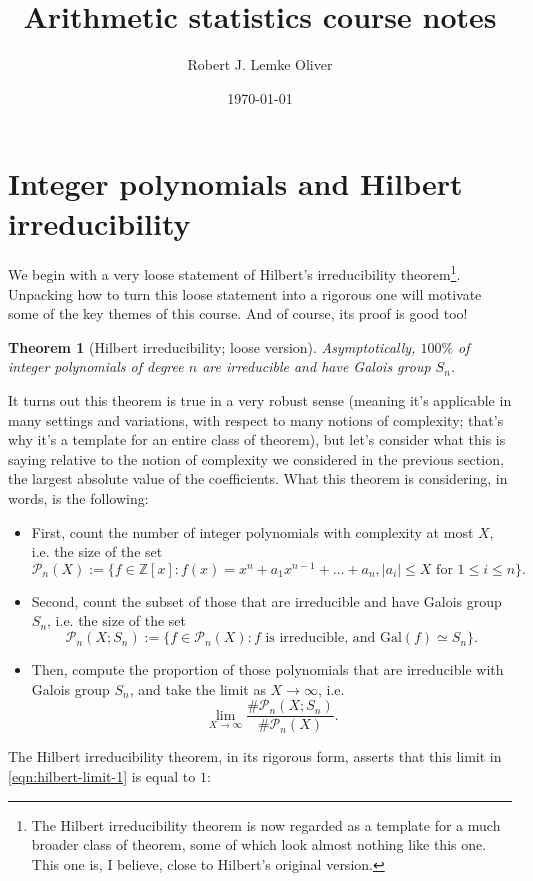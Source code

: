 \documentclass[12pt]{amsart}
\title{Arithmetic statistics course notes}
\author{Robert J. Lemke Oliver}
\date{\today}
\newtheorem{theorem}{Theorem}
\theoremstyle{definition} \newtheorem*{notation}{Notation}
\theoremstyle{remark} \newtheorem*{remark}{Remark}
\numberwithin{equation}{section}
\numberwithin{theorem}{section}
\begin{document}
	\maketitle
	
	\setcounter{section}{0}
	
\section{Integer polynomials and Hilbert irreducibility}
	
	We begin with a very loose statement of Hilbert's irreducibility theorem\footnote{The Hilbert irreducibility theorem is now regarded as a template for a much broader class of theorem, some of which look almost nothing like this one.  This one is, I believe, close to Hilbert's original version.}.  Unpacking how to turn this loose statement into a rigorous one will motivate some of the key themes of this course.  And of course, its proof is good too!
	
	\begin{theorem}[Hilbert irreducibility; loose version]
		Asymptotically, $100\%$ of integer polynomials of degree $n$ are irreducible and have Galois group $S_n$.
	\end{theorem}
	
	It turns out this theorem is true in a very robust sense (meaning it's applicable in many settings and variations, with respect to many notions of complexity; that's why it's a template for an entire class of theorem), but let's consider what this is saying relative to the notion of complexity we considered in the previous section, the largest absolute value of the coefficients.  What this theorem is considering, in words, is the following:
		\begin{itemize}
			\item First, count the number of integer polynomials with complexity at most $X$, i.e. the size of the set 
				\[
					\mathcal{P}_n(X):=\{f \in \mathbb{Z}[x] : f(x) = x^n + a_1x^{n-1} + \dots + a_n, |a_i| \leq X \text{ for } 1\leq i \leq n\}.
				\]
			\item Second, count the subset of those that are irreducible and have Galois group $S_n$, i.e. the size of the set
				\[
					\mathcal{P}_n(X;S_n) := \{f \in \mathcal{P}_n(X) : f \text{ is irreducible, and } \mathrm{Gal}(f) \simeq S_n\}.
				\]
			\item Then, compute the proportion of those polynomials that are irreducible with Galois group $S_n$, and take the limit as $X\to \infty$, i.e.
				\begin{equation}\label{eqn:hilbert-limit-1}
					\lim_{X \to \infty} \frac{\#\mathcal{P}_n(X;S_n)}{\#\mathcal{P}_n(X)}.
				\end{equation}
		\end{itemize}
	The Hilbert irreducibility theorem, in its rigorous form, asserts that this limit in \eqref{eqn:hilbert-limit-1} is equal to $1$:
	
\end{document}
